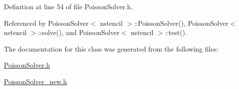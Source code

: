 Definition at line 54 of file PoissonSolver.h.



Referenced by PoissonSolver$<$ nstencil $>$::PoissonSolver(), PoissonSolver$<$ nstencil $>$::solve(), and PoissonSolver$<$ nstencil $>$::test().



The documentation for this class was generated from the following files:\begin{DoxyCompactItemize}
\item 
\hyperlink{PoissonSolver_8h}{PoissonSolver.h}\item 
\hyperlink{PoissonSolver__new_8h}{PoissonSolver\_\-new.h}\end{DoxyCompactItemize}
